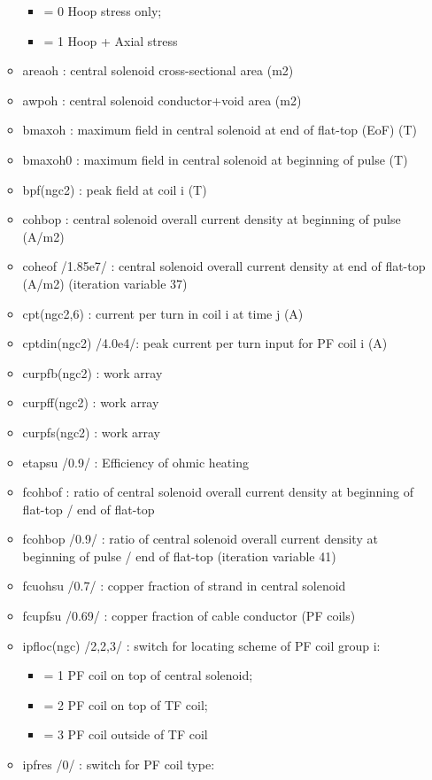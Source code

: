 \documentclass[]{article}
\providecommand{\tightlist}{%
  \setlength{\itemsep}{0pt}\setlength{\parskip}{0pt}}
\begin{document}
\begin{itemize}
\begin{itemize}
    \begin{itemize}
    \tightlist
    \item
      = 0 Hoop stress only;
    \item
      = 1 Hoop + Axial stress
    \end{itemize}
  \item
    areaoh : central solenoid cross-sectional area (m2)
  \item
    awpoh : central solenoid conductor+void area (m2)
  \item
    bmaxoh : maximum field in central solenoid at end of flat-top (EoF)
    (T)
  \item
    bmaxoh0 : maximum field in central solenoid at beginning of pulse
    (T)
  \item
    bpf(ngc2) : peak field at coil i (T)
  \item
    cohbop : central solenoid overall current density at beginning of
    pulse (A/m2)
  \item
    coheof /1.85e7/ : central solenoid overall current density at end of
    flat-top (A/m2) (iteration variable 37)
  \item
    cpt(ngc2,6) : current per turn in coil i at time j (A)
  \item
    cptdin(ngc2) /4.0e4/: peak current per turn input for PF coil i (A)
  \item
    curpfb(ngc2) : work array
  \item
    curpff(ngc2) : work array
  \item
    curpfs(ngc2) : work array
  \item
    etapsu /0.9/ : Efficiency of ohmic heating
  \item
    fcohbof : ratio of central solenoid overall current density at
    beginning of flat-top / end of flat-top
  \item
    fcohbop /0.9/ : ratio of central solenoid overall current density at
    beginning of pulse / end of flat-top (iteration variable 41)
  \item
    fcuohsu /0.7/ : copper fraction of strand in central solenoid
  \item
    fcupfsu /0.69/ : copper fraction of cable conductor (PF coils)
  \item
    ipfloc(ngc) /2,2,3/ : switch for locating scheme of PF coil group i:

    \begin{itemize}
    \tightlist
    \item
      = 1 PF coil on top of central solenoid;
    \item
      = 2 PF coil on top of TF coil;
    \item
      = 3 PF coil outside of TF coil
    \end{itemize}
  \item
    ipfres /0/ : switch for PF coil type:


\end{itemize}
\end{itemize}
\end{document}
